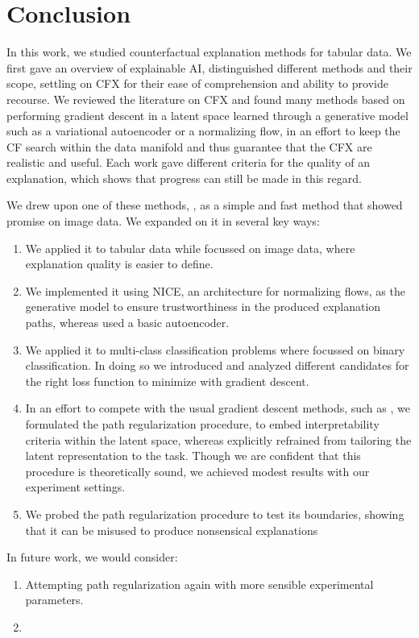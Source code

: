 \documentclass[../main.tex]{subfiles}
\begin{document}
\chapter{Conclusion}
\label{ch:conclusion}

In this work, we studied counterfactual explanation methods for tabular data.
We first gave an overview of explainable AI, distinguished different methods and their scope, settling on CFX for their ease of comprehension and ability to provide recourse.
We reviewed the literature on CFX and found many methods based on performing gradient descent in a latent space learned through a generative model such as a variational autoencoder or a normalizing flow, in an effort to keep the CF search within the data manifold and thus guarantee that the CFX are realistic and useful.
Each work gave different criteria for the quality of an explanation, which shows that progress can still be made in this regard.

We drew upon one of these methods, \ls{}, as a simple and fast method that showed promise on image data.
We expanded on it in several key ways:
\begin{enumerate}
    \item We applied it to tabular data while \citeauthor{cohenGifsplanation2022} focussed on image data, where explanation quality is easier to define.
    \item We implemented it using NICE, an architecture for normalizing flows, as the generative model to ensure trustworthiness in the produced explanation paths, whereas \citeauthor{cohenGifsplanation2022} used a basic autoencoder.
    \item We applied it to multi-class classification problems where \citeauthor{cohenGifsplanation2022} focussed on binary classification. In doing so we introduced and analyzed different candidates for the right loss function to minimize with gradient descent.
    \item In an effort to compete with the usual gradient descent methods, such as \revise{} \cite{joshiRealistic2019}, we formulated the path regularization procedure, to embed interpretability criteria within the latent space, whereas \citeauthor{cohenGifsplanation2022} explicitly refrained from tailoring the latent representation to the task.
    Though we are confident that this procedure is theoretically sound, we achieved modest results with our experiment settings.
    \item We probed the path regularization procedure to test its boundaries, showing that it can be misused to produce nonsensical explanations 
\end{enumerate}

In future work, we would consider:
\begin{enumerate}
    \item Attempting path regularization again with more sensible experimental parameters.
    \item {}
\end{enumerate}
\end{document}
